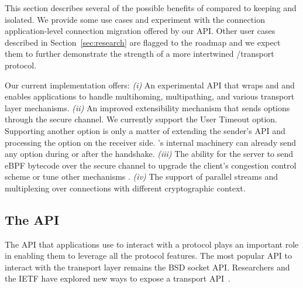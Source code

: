 \label{sec:content}

This section describes several of the possible benefits of \tcpls
compared to keeping \tcp and \tls isolated.
We provide some use cases and experiment with the
connection application-level connection migration offered by our API. Other user
cases described in Section~\ref{sec:research} are flagged to the roadmap and we
expect them to further demonstrate the
strength of a more intertwined \tls/\tcp transport protocol.

Our current implementation offers:
\textit{(i)} An experimental API that wraps \tls and \tcp and enables
    applications to
    handle multihoming, multipathing, and various transport layer mechanisms.
  \textit{(ii)} An improved \tcp extensibility mechanism that sends \tcp options
    through the secure \tcpls channel. We currently support the \tcp
    User Timeout option. Supporting another \tcp option is only a matter of
    extending the sender's API and processing the option
    on the receiver side. \tcpls's internal machinery can already send any \tcp
    option during or after the handshake.
\textit{(iii)} The ability for the server to send eBPF bytecode over the secure
  channel to upgrade the client's \tcp congestion control scheme or
  tune other \tcp mechanisms \cite{brakmo2017tcp, tran2019beyond}.
  \textit{(iv)} The support of parallel streams and multiplexing over \tcp connections
    with different cryptographic context.

\subsection{The \tcpls API}

The API that applications use to interact with a protocol plays an important
role in enabling them to leverage all the protocol features. The most
popular API to interact with the transport layer remains the BSD socket
API. Researchers and the IETF have explored new
ways to expose a transport API~\cite{draft-ietf-taps-arch,hruby2014sockets,rfc6458,hesmans2016enhanced,schmidt2013socket}.

